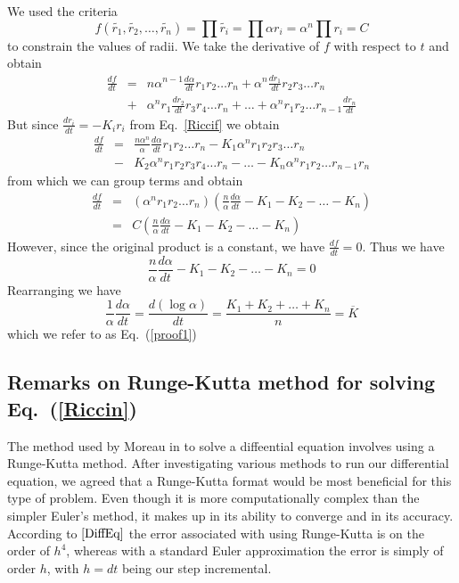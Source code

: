 \documentclass[12pt]{article}
\begin{document}
	We used the criteria $$f(\tilde{r_1},\tilde{r_2},\ldots,\tilde{r_n}) = \prod{\tilde{r_i}} = \prod{\alpha r_i} = \alpha^n\prod{r_i}= C$$ to constrain the values of radii. We take the derivative of $f$ with respect to $t$ and obtain
	\begin{eqnarray*}
	\frac{df}{dt} & = & n\alpha^{n-1}\frac{d\alpha}{dt}r_1r_2\ldots r_n + \alpha^n\frac{dr_1}{dt}r_2r_3\ldots r_n\\
								& + & \alpha^nr_1\frac{dr_2}{dt}r_3r_4\ldots r_n + \ldots + \alpha^nr_1r_2\ldots r_{n-1}\frac{dr_n}{dt}
	\end{eqnarray*}
	But since $\displaystyle \frac{dr_i}{dt} = -K_ir_i$ from Eq.~\ref{Riccif} we obtain
	\begin{eqnarray*}
	\frac{df}{dt} & = & \frac{n\alpha^{n}}{\alpha}\frac{d\alpha}{dt}r_1r_2\ldots r_n - K_1\alpha^nr_1r_2r_3\ldots r_n\\
								& - & K_2\alpha^nr_1r_2r_3r_4\ldots r_n - \ldots - K_n\alpha^nr_1r_2\ldots r_{n-1}r_n
	\end{eqnarray*}
	from which we can group terms and obtain
	\begin{eqnarray*}
	\frac{df}{dt} & = & (\alpha^nr_1r_2\ldots r_n)(\frac{n}{\alpha}\frac{d\alpha}{dt} - K_1 - K_2 - \ldots - K_n)\\
								& = & C(\frac{n}{\alpha}\frac{d\alpha}{dt} - K_1 - K_2 - \ldots - K_n)
	\end{eqnarray*}
	However, since the original product is a constant, we have $\displaystyle \frac{df}{dt} = 0.$ Thus we have $$\frac{n}{\alpha}\frac{d\alpha}{dt} - K_1 - K_2 - \ldots - K_n = 0$$
	Rearranging we have
$$\frac{1}{\alpha}\frac{d\alpha}{dt} = \frac{d(\log \alpha)}{dt} = \frac{K_1 + K_2 + \ldots + K_n}{n} = \overline{K}$$
	which we refer to as Eq.~(\ref{proof1})
  
  \subsection*{Remarks on Runge-Kutta method for solving Eq.~(\ref{Riccin})}
	\maketitle

The method used by Moreau in \cite{JPM} to solve a diffeential equation involves using a Runge-Kutta method. After investigating various methods to run our differential equation, we agreed that a Runge-Kutta format would be most beneficial for this type of problem. Even though it is more computationally complex than the simpler Euler's method, it makes up in its ability to converge and in its accuracy. According to $\cite{DiffEq}$ the error associated with using Runge-Kutta is on the order of $h^4$, whereas with a standard Euler approximation the error is simply of order $h$, with $h = dt$ being our step incremental. \newline
\end{document}
